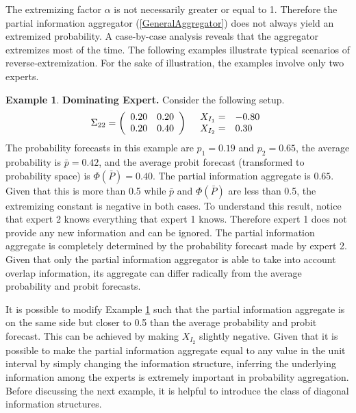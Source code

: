 \documentclass[11pt,twoside]{article}
\theoremstyle{definition}
\newtheorem{example}[theorem]{Example}
\theoremstyle{definition}
\begin{document}
The extremizing factor $\alpha$ is not necessarily greater or equal to 1. Therefore the partial information aggregator (\ref{GeneralAggregator}) does not always yield an extremized probability. A case-by-case analysis reveals that the aggregator extremizes most of the time. The following examples illustrate typical scenarios of reverse-extremization. For the sake of illustration, the examples involve only two experts. 



\begin{example}
\label{Example1}
\textbf{Dominating Expert.} Consider the following setup.
\begin{align*}
\Sigma_{22} =  \left(\begin{array}{c c}
0.20 & 0.20\\
0.20 & 0.40 \\
 \end{array}\right)
  && 
  \begin{array}{l l}
X_{I_1} =& -0.80\\
X_{I_2} =& 0.30
 \end{array}
\end{align*}
The probability forecasts in this example are $p_1 = 0.19$ and $p_2 = 0.65$, the average probability is $\bar{p} = 0.42$, and the average probit forecast (transformed to probability space) is $\Phi(\bar{P}) = 0.40$. 
The partial information aggregate is $0.65$.  Given that this is more than 0.5 while $\bar{p}$ and $\Phi(\bar{P})$ are less than 0.5, the extremizing constant is negative in both cases. To understand this result, notice that expert 2 knows everything that expert 1 knows. Therefore expert 1 does not provide any new information and can be ignored. The partial information aggregate is completely determined by the probability forecast made by expert 2. Given that only the partial information aggregator is able to take into account overlap information, its aggregate can differ radically from the average probability and probit forecasts. 
\end{example}
It is possible to modify Example \ref{Example1} such that the partial information aggregate is on the same side but closer to 0.5 than the average probability and probit forecast. This can be achieved by making $X_{I_2}$ slightly negative. Given that it is possible to make the partial information aggregate equal to any value in the unit interval by simply changing the information structure, inferring the underlying information among the experts is extremely important in probability aggregation.  Before discussing the next example, it is helpful to introduce the class of diagonal information structures. 
\end{document}
